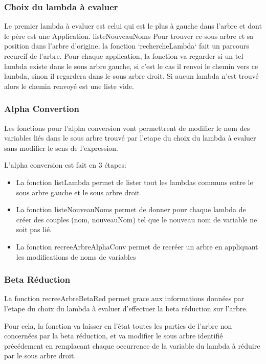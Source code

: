 \documentclass[a4paper,11pt,titlepage]{article}
\begin{document}
\subsubsection{Choix du lambda à evaluer}

Le premier lambda à evaluer est celui qui est le plus à gauche dans l'arbre et dont le père est une Application.
listeNouveauNoms
Pour trouver ce sous arbre et sa position dans l'arbre d'origine, la fonction `rechercheLambda` fait un parcours recurcif de l'arbre.
Pour chaque application, la fonction va regarder si un tel lambda existe dans le sous arbre gauche, si c'est le cas il renvoi le chemin vers ce lambda,
 sinon il regardera dans le sous arbre droit. Si aucun lambda n'est trouvé alors le chemin renvoyé est une liste vide.

\subsubsection{Alpha Convertion}

Les fonctions pour l'alpha conversion vont permettrent de modifier le nom des variables liés dans le sous arbre trouvé par 
l'etape du choix du lambda à evaluer sans modifier le sens de l'expression.

L'alpha conversion est fait en 3 étapes:
\begin{itemize}
 \item La fonction listLambda permet de lister tout les lambdas communs entre le sous arbre gauche et le sous arbre droit
 \item La fonction listeNouveauNoms permet de donner pour chaque lambda de créer des couples (nom, nouveauNom) tel que le nouveau
nom de variable ne soit pas lié.
 \item La fonction recreeArbreAlphaConv permet de recréer un arbre en appliquant les modifications de noms de variables
\end{itemize}


\subsubsection{Beta Réduction}

  La fonction recreeArbreBetaRed permet grace aux informations données par l'etape du choix du lambda à evaluer d'effectuer la
beta réduction sur l'arbre.

  Pour cela, la fonction va laisser en l'état toutes les parties de l'arbre non concernées par la beta réduction, et va modifier
le sous arbre identifié précédement en remplacant chaque occurrence de la variable du lambda à réduire par le sous arbre
droit.
\end{document}
